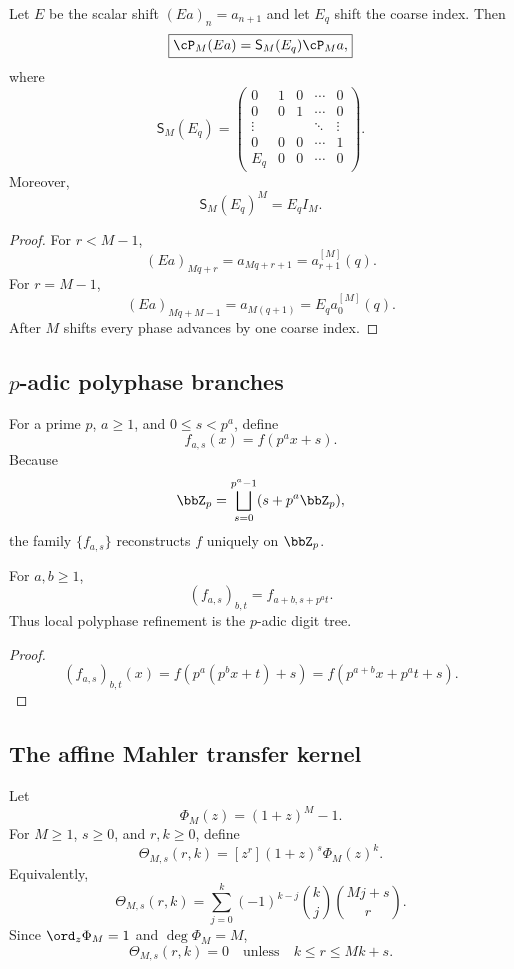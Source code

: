 \begin{theorem}
Let $E$ be the scalar shift $(Ea)_n=a_{n+1}$ and let $E_q$ shift the coarse index. Then
\[
 \boxed{\cP_M(Ea)=\mathsf S_M(E_q)\cP_Ma,}
\]
where
\[
 \mathsf S_M(E_q)=
 \begin{pmatrix}
 0&1&0&\cdots&0\\
 0&0&1&\cdots&0\\
 \vdots&&&\ddots&\vdots\\
 0&0&0&\cdots&1\\
 E_q&0&0&\cdots&0
 \end{pmatrix}.
\]
Moreover,
\[
 \boxed{\mathsf S_M(E_q)^M=E_qI_M.}
\]
\end{theorem}

\begin{proof}
For $r<M-1$,
\[
 (Ea)_{Mq+r}=a_{Mq+r+1}=a_{r+1}^{[M]}(q).
\]
For $r=M-1$,
\[
 (Ea)_{Mq+M-1}=a_{M(q+1)}=E_qa_0^{[M]}(q).
\]
After $M$ shifts every phase advances by one coarse index.
\end{proof}

\subsection{\texorpdfstring{$p$-adic}{p-adic} polyphase branches}
For a prime $p$, $a\geq1$, and $0\leq s<p^a$, define
\[
 \boxed{f_{a,s}(x)=f(p^ax+s).}
\]
Because
\[
 \bbZ_p=\bigsqcup_{s=0}^{p^a-1}(s+p^a\bbZ_p),
\]
the family $\{f_{a,s}\}$ reconstructs $f$ uniquely on $\bbZ_p$.

\begin{theorem}
For $a,b\geq1$,
\[
 \boxed{(f_{a,s})_{b,t}=f_{a+b,s+p^at}.}
\]
Thus local polyphase refinement is the $p$-adic digit tree.
\end{theorem}

\begin{proof}
\[
 (f_{a,s})_{b,t}(x)=f(p^a(p^bx+t)+s)=f(p^{a+b}x+p^at+s).
\]
\end{proof}

\subsection{The affine Mahler transfer kernel}
Let
\[
 \Phi_M(z)=(1+z)^M-1.
\]
For $M\geq1$, $s\geq0$, and $r,k\geq0$, define
\[
 \boxed{\Theta_{M,s}(r,k)=[z^r](1+z)^s\Phi_M(z)^k.}
\]
Equivalently,
\[
 \boxed{\Theta_{M,s}(r,k)=\sum_{j=0}^{k}(-1)^{k-j}\binom kj\binom{Mj+s}{r}.}
\]
Since $\ord_z\Phi_M=1$ and $\deg\Phi_M=M$,
\[
 \boxed{\Theta_{M,s}(r,k)=0\quad\text{unless}\quad k\leq r\leq Mk+s.}
\]

